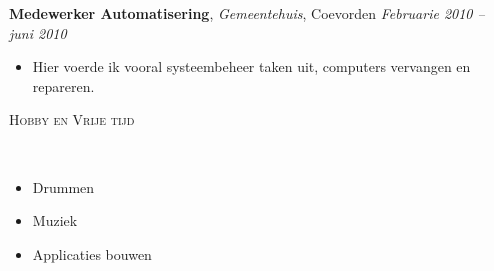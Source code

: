 \documentclass[9pt]{article}
\newenvironment{changemargin}[2]{%
  \begin{list}{}{%
    \setlength{\topsep}{0pt}%
    \setlength{\leftmargin}{#1}%
    \setlength{\rightmargin}{#2}%
    \setlength{\listparindent}{\parindent}%
    \setlength{\itemindent}{\parindent}%
    \setlength{\parsep}{\parskip}%
  }%
  \item[]}{\end{list}
}
\newcommand{\lineover}{
	\begin{changemargin}{-0.05in}{-0.05in}
		\vspace*{-8pt}
		\hrulefill \\
		\vspace*{-2pt}
	\end{changemargin}
}
\newcommand{\header}[1]{
	\begin{changemargin}{-0.5in}{-0.5in}
		\scshape{\niceHeadSmall#1}\\
  	\lineover
	\end{changemargin}
}
\newenvironment{body} {
	\vspace*{-16pt}
	\begin{changemargin}{-0.25in}{-0.5in}
  }	
	{\end{changemargin}
}
\begin{document}
\begin{body}
	\textbf {Medewerker Automatisering}, \emph{Gemeentehuis}, Coevorden \hfill \emph{Februarie 2010 -- juni 2010}\\
	\vspace*{-4pt}
	\begin{itemize} \itemsep -0pt
		\item Hier voerde ik vooral systeembeheer taken uit, computers vervangen en repareren.  
	\end{itemize}
\end{body}

\smallskip


\header{Hobby en Vrije tijd}

\begin{body}
	\vspace{14pt}
	\begin{itemize} \itemsep -0pt  %
		\item Drummen
		\item Muziek
		\item Applicaties bouwen
	\end{itemize}

\end{body}

\smallskip


\smallskip
\end{document}
